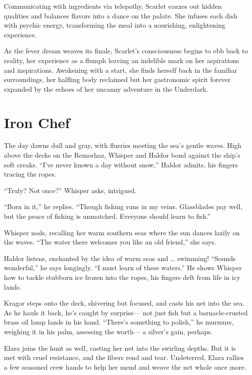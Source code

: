 \documentclass[
  letterpaper,12pt,twoside,twocolumn,openany,
  nodeprecatedcode,bg=full]{dndbook}
\begin{document}
Communicating with ingredients via telepathy, Scarlet coaxes out hidden
qualities and balances flavors into a dance on the palate. She infuses
each dish with psychic energy, transforming the meal into a nourishing,
enlightening experience.

As the fever dream weaves its finale, Scarlet's consciousness begins to
ebb back to reality, her experience as a flumph leaving an indelible
mark on her aspirations and inspirations. Awakening with a start, she
finds herself back in the familiar surroundings, her halfling body
reclaimed but her gastronomic spirit forever expanded by the echoes of
her uncanny adventure in the Underdark.

\section{Iron Chef}\label{iron-chef}

The day dawns dull and gray, with flurries meeting the sea's gentle
waves. High above the decks on the Remorhaz, Whisper and Haldor bond
against the ship's soft creaks. ``I've never known a day without snow,''
Haldor admits, his fingers tracing the ropes.

``Truly? Not once?'' Whisper asks, intrigued.

``Born in it,'' he replies. ``Though fishing runs in my veins.
Glassblades pay well, but the peace of fishing is unmatched. Everyone
should learn to fish.''

Whisper nods, recalling her warm southern seas where the sun dances
lazily on the waves. ``The water there welcomes you like an old
friend,'' she says.

Haldor listens, enchanted by the idea of warm seas and \ldots{}
swimming! ``Sounds wonderful,'' he says longingly. ``I must learn of
these waters.'' He shows Whisper how to tackle stubborn ice frozen into
the ropes, his fingers deft from life in icy lands.

Kragor steps onto the deck, shivering but focused, and casts his net
into the sea. As he hauls it back, he's caught by surprise--- not just
fish but a barnacle-crusted brass oil lamp lands in his hand. ``There's
something to polish,'' he murmurs, weighing it in his palm, assessing
the worth--- a silver's gain, perhaps.

Elara joins the hunt as well, casting her net into the swirling depths.
But it is met with cruel resistance, and the fibers rend and tear.
Undeterred, Elara rallies a few seasoned crew hands to help her mend and
weave the net whole once more.
\end{document}
